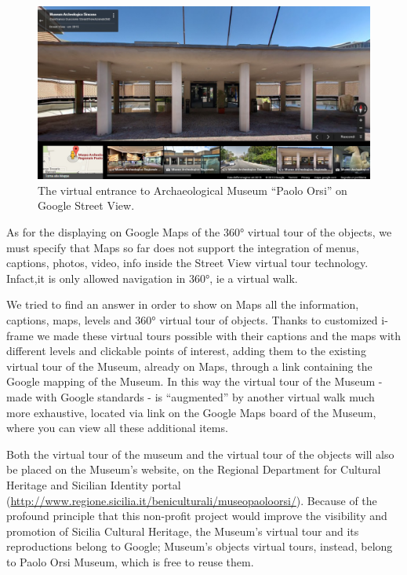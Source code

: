 \documentclass[amsthm,ebook]{saparticle}
\begin{document}
\begin{figure}[!bp]
\centering
 \includegraphics[width=\columnwidth]{EAGLE2016BONACINIPilotprojectatPaoloOrsiMuseum-img001.jpg}
\caption{The virtual entrance to Archaeological Museum ``Paolo Orsi'' on Google Street View. }
\label{fig:1}
\end{figure}


As for the displaying on Google Maps of the 360° virtual tour of the objects, we must specify that Maps so far does not
support the integration of menus, captions, photos, video, info inside the Street View virtual tour technology.
Infact,it is only allowed navigation in 360°, ie a virtual walk.

We tried to find an answer in order to show on Maps all the information, captions, maps, levels and 360° virtual tour of
objects. Thanks to customized i-frame we made these virtual tours possible with their captions and the maps with
different levels and clickable points of interest, adding them to the existing virtual tour of the Museum, already on
Maps, through a link containing the Google mapping of the Museum. In this way the virtual tour of the Museum - made
with Google standards - is ``augmented'' by another virtual walk much more exhaustive, located via link on the Google
Maps board of the Museum, where you can view all these additional items.

Both the virtual tour of the museum and the virtual tour of the objects will also be placed on the Museum's website, on
the Regional Department for Cultural Heritage and Sicilian Identity portal
(\url{http://www.regione.sicilia.it/beniculturali/museopaoloorsi/}). Because of the profound principle that this non-profit
project would improve the visibility and promotion of Sicilia Cultural Heritage, the Museum’s virtual tour and its
reproductions belong to Google; Museum’s objects virtual tours, instead, belong to Paolo Orsi Museum, which is free to
reuse them. 
\end{document}
